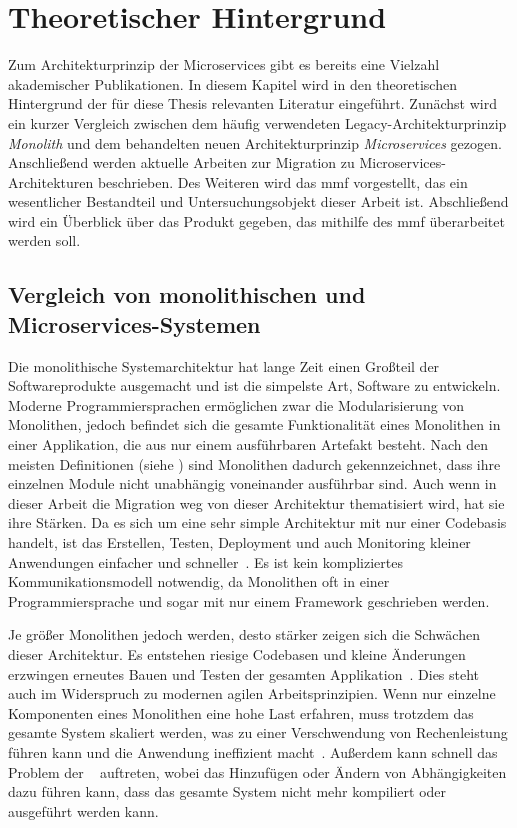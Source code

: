\chapter{Theoretischer Hintergrund}
\label{chap:theoretischer-hintergrund}
Zum Architekturprinzip der Microservices gibt es bereits eine Vielzahl akademischer Publikationen.
In diesem Kapitel wird in den theoretischen Hintergrund der für diese Thesis relevanten Literatur eingeführt.
Zunächst wird ein kurzer Vergleich zwischen dem häufig verwendeten Legacy-Architekturprinzip \emph{Monolith} und dem behandelten neuen Architekturprinzip \emph{Microservices} gezogen.
Anschließend werden aktuelle Arbeiten zur Migration zu Microservices-Architekturen beschrieben.
Des Weiteren wird das \acrfull{mmf} vorgestellt, das ein wesentlicher Bestandteil und Untersuchungsobjekt dieser Arbeit ist.
Abschließend wird ein Überblick über das Produkt gegeben, das mithilfe des \gls{mmf} überarbeitet werden soll.

\section{Vergleich von monolithischen und Microservices-Systemen}
\label{sec:monolith-vs-microservices}

Die monolithische Systemarchitektur hat lange Zeit einen Großteil der Softwareprodukte ausgemacht und ist die simpelste Art, Software zu entwickeln.
Moderne Programmiersprachen ermöglichen zwar die Modularisierung von Monolithen, jedoch befindet sich die gesamte Funktionalität eines Monolithen in einer Applikation, die aus nur einem ausführbaren Artefakt besteht.
Nach den meisten Definitionen (siehe \cite{Dragoni2017}) sind Monolithen dadurch gekennzeichnet, dass ihre einzelnen Module nicht unabhängig voneinander ausführbar sind.
Auch wenn in dieser Arbeit die Migration weg von dieser Architektur thematisiert wird, hat sie ihre Stärken.
Da es sich um eine sehr simple Architektur mit nur einer Codebasis handelt, ist das Erstellen, Testen, Deployment und auch Monitoring kleiner Anwendungen einfacher und schneller~\cite{a-survey-on}.
Es ist kein kompliziertes Kommunikationsmodell notwendig, da Monolithen oft in einer Programmiersprache und sogar mit nur einem Framework geschrieben werden.

Je größer Monolithen jedoch werden, desto stärker zeigen sich die Schwächen dieser Architektur.
Es entstehen riesige Codebasen und kleine Änderungen erzwingen erneutes Bauen und Testen der gesamten Applikation~\cite{Dragoni2017}.
Dies steht auch im Widerspruch zu modernen agilen Arbeitsprinzipien.
Wenn nur einzelne Komponenten eines Monolithen eine hohe Last erfahren, muss trotzdem das gesamte System skaliert werden, was zu einer Verschwendung von Rechenleistung führen kann und die Anwendung ineffizient macht~\cite{Dragoni2017}.
Außerdem kann schnell das Problem der ~\cite{Dragoni2017} auftreten, wobei das Hinzufügen oder Ändern von Abhängigkeiten dazu führen kann, dass das gesamte System nicht mehr kompiliert oder ausgeführt werden kann.

